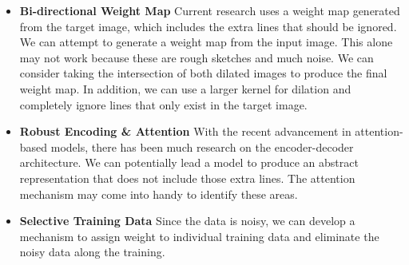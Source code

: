 \begin{itemize}
    \item \textbf{Bi-directional Weight Map} Current research uses a weight map generated from the target image, which includes the extra lines that should be ignored. We can attempt to generate a weight map from the input image. This alone may not work because these are rough sketches and much noise. We can consider taking the intersection of both dilated images to produce the final weight map. In addition, we can use a larger kernel for dilation and completely ignore lines that only exist in the target image.
    \item \textbf{Robust Encoding \& Attention} With the recent advancement in attention-based models, there has been much research on the encoder-decoder architecture. We can potentially lead a model to produce an abstract representation that does not include those extra lines. The attention mechanism may come into handy to identify these areas.
    \item \textbf{Selective Training Data} Since the data is noisy, we can develop a mechanism to assign weight to individual training data and eliminate the noisy data along the training.
\end{itemize}




